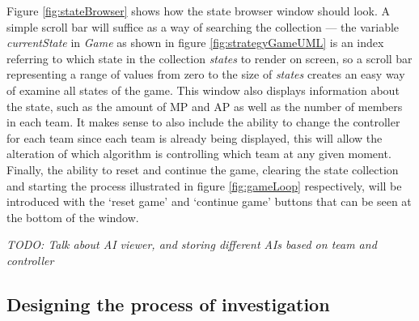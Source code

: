 \documentclass[11pt, a4paper]{report}
\begin{document}
Figure \ref{fig:stateBrowser} shows how the state browser window should look. A simple scroll bar will suffice as a way of searching the collection --- the variable \emph{currentState} in \emph{Game} as shown in figure \ref{fig:strategyGameUML} is an index referring to which state in the collection \emph{states} to render on screen, so a scroll bar representing a range of values from zero to the size of \emph{states} creates an easy way of examine all states of the game. This window also displays information about the state, such as the amount of MP and AP as well as the number of members in each team. It makes sense to also include the ability to change the controller for each team since each team is already being displayed, this will allow the alteration of which algorithm is controlling which team at any given moment. Finally, the ability to reset and continue the game, clearing the state collection and starting the process illustrated in figure \ref{fig:gameLoop} respectively, will be introduced with the `reset game' and `continue game' buttons that can be seen at the bottom of the window. 

\emph{TODO: Talk about AI viewer, and storing different AIs based on team and controller}

\subsection{Designing the process of investigation}
\label{subsec:designingInvestigation process}
\end{document}
